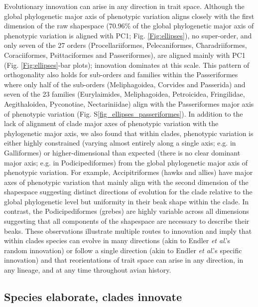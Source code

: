 \documentclass[12pt,letterpaper]{article}
\begin{document}
Evolutionary innovation can arise in any direction in trait space.
Although the global phylogenetic major axis of phenotypic variation aligns closely with the first dimension of the raw shapespace (70.96\% of the global phylogenetic major axis of phenotypic variation is aligned with PC1; Fig. \ref{Fig:ellipses}), no super-order, and only seven of the 27 orders (Procellariiformes, Pelecaniformes, Charadriiformes, Coraciiformes, Psittaciformes and Passeriformes), are aligned mainly with PC1 (Fig. \ref{Fig:ellipses}-bar plots); innovation dominates at this scale.
This pattern of orthogonality also holds for sub-orders and families within the Passeriformes where only half of the sub-orders (Meliphagoidea, Corvides and Passerida) and seven of the 23 families (Eurylaimides, Meliphagoidea, Petroicidea, Fringilidae, Aegithaloidea, Pyconotiae, Nectariniidae) align with the Passeriformes major axis of phenotypic variation (Fig. S\ref{fig_ellipses_passeriformes}).
In addition to the lack of alignment of clade major axes of phenotypic variation with the phylogenetic major axis, we also found that within clades, phenotypic variation is either highly constrained (varying almost entirely along a single axis; e.g. in Galliformes) or higher-dimensional than expected (there is no clear dominant major axis; e.g. in Podicipediformes) from the global phylogenetic major axis of phenotypic variation.
For example, Accipitriformes (hawks and allies) have major axes of phenotypic variation that mainly align with the second dimension of the shapespace suggesting distinct directions of evolution for the clade relative to the global phylogenetic level but uniformity in their beak shape within the clade.
In contrast, the Podicipediformes (grebes) are highly variable across all dimensions suggesting that all components of the shapespace are necessary to describe their beaks.
These observations illustrate multiple routes to innovation and imply that within clades species can evolve in many directions (akin to Endler \textit{et al}.'s \cite{endler2005animal} random innovation) or follow a single direction (akin to Endler \textit{et al}.'s \cite{endler2005animal} specific innovation) and that reorientations of trait space can arise in any direction, in any lineage, and at any time throughout avian history.


\subsection{Species elaborate, clades innovate}
\end{document}
